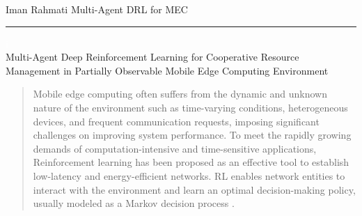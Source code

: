 \documentclass[12pt]{article}
\begin{document}
	

	
%



\begin{center} 
	
	
	\vspace{-17mm}
	
	\large Iman Rahmati  \hfill Multi-Agent DRL for MEC\vspace{1mm} \hrule
	
	\vspace{-1mm}
	
	\textcolor{white}{i} \\ \LARGE Multi-Agent Deep Reinforcement Learning for Cooperative Resource Management in Partially Observable Mobile Edge Computing Environment \vspace{6mm}\\
	
	
\end{center}



\vspace{-8mm}

\begin{abstract}
	\vspace{-2mm}
	\noindent
	Mobile edge computing often suffers from the dynamic and unknown nature of the environment such as time-varying conditions, heterogeneous devices, and frequent communication requests, imposing significant challenges on improving system performance. To meet the rapidly growing demands of computation-intensive and time-sensitive applications, Reinforcement learning \cite{mnih2015human} has been proposed as an effective tool to establish low-latency and energy-efficient networks. RL enables network entities to interact with the environment and learn an optimal decision-making policy, usually modeled as a Markov decision process \cite{puterman2014markov}.
\end{abstract}



	
\vspace{4mm}
\end{document}

